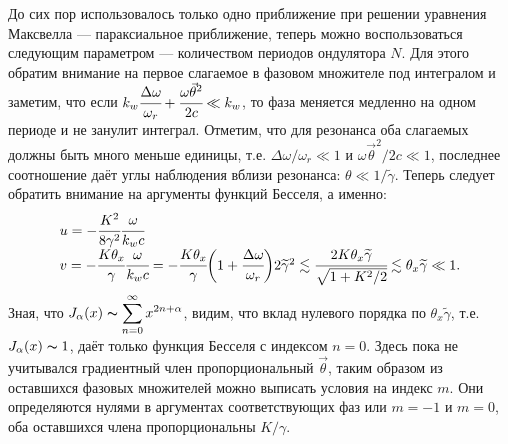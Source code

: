До сих пор использовалось только одно приближение при решении уравнения Максвелла --- параксиальное приближение, теперь можно воспользоваться следующим параметром --- количеством периодов ондулятора $N$. Для этого обратим внимание на первое слагаемое в фазовом множителе под интегралом и заметим, что если $k_w \cfrac{\Delta\omega}{\omega_r} + 
\cfrac{\omega\vec{\theta}^2}{2c} \ll k_w$, то фаза меняется медленно на одном периоде и не занулит интеграл. Отметим, что для резонанса оба слагаемых должны быть много меньше единицы, т.е. $\Delta\omega/\omega_r \ll 1$ и $\omega\vec{\theta}^2/2c \ll 1$, последнее соотношение даёт углы наблюдения вблизи резонанса: $\theta \ll 1/\widetilde{\gamma}$. Теперь следует обратить внимание на аргументы функций Бесселя, а именно: 
\begin{equation}
	\begin{array}{lcl}
		u = -\cfrac{K^2}{8\gamma^2}\cfrac{\omega}{k_w c}\\
		v = -\cfrac{K{\theta_x}}{\gamma}\cfrac{\omega}{k_w c} = - \cfrac{K{\theta_x}}{\gamma}
		\bigg(1 + \cfrac{\Delta\omega}{\omega_r}\bigg)2\widetilde{\gamma}^2 \lesssim
		\cfrac{2K{\theta_x}\widetilde{\gamma}}{\sqrt{1 + K^2/2}} \lesssim \theta_x\widetilde{\gamma} \ll 1.
	\end{array}	
\end{equation}
Зная, что $J_\alpha(x) \thicksim \displaystyle\sum\limits_{n =0}^{\infty} x^{2n + \alpha} $, видим, что вклад нулевого порядка по $\theta_x\widetilde{\gamma}$, т.е. $J_\alpha(x) \thicksim 1$, даёт только функция Бесселя с индексом $n = 0$. Здесь пока не учитывался градиентный член пропорциональный $\vec{\theta}$, таким образом из оставшихся фазовых множителей можно выписать условия на индекс $m$. Они определяются нулями в аргументах соответствующих фаз или $m = -1$ и $m = 0$, оба оставшихся члена пропорциональны $K/\gamma$. 

